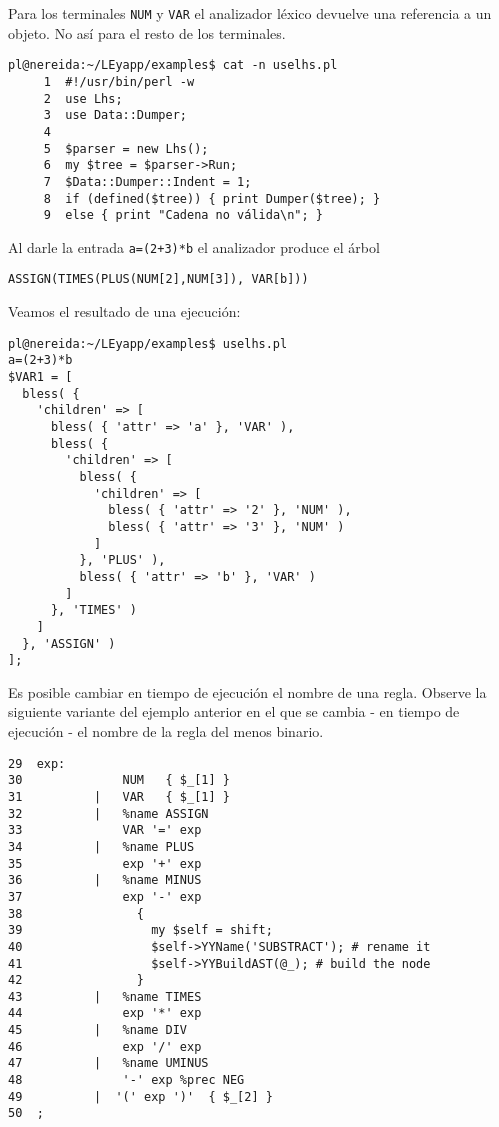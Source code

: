 Para los terminales \verb|NUM|
y \verb|VAR| el analizador léxico 
devuelve una referencia a un objeto.
No así para el resto de los terminales.


\begin{verbatim}
pl@nereida:~/LEyapp/examples$ cat -n uselhs.pl
     1  #!/usr/bin/perl -w
     2  use Lhs;
     3  use Data::Dumper;
     4
     5  $parser = new Lhs();
     6  my $tree = $parser->Run;
     7  $Data::Dumper::Indent = 1;
     8  if (defined($tree)) { print Dumper($tree); }
     9  else { print "Cadena no válida\n"; }
\end{verbatim}


Al darle la entrada \verb|a=(2+3)*b| el analizador produce el
árbol 

\begin{verbatim} 
ASSIGN(TIMES(PLUS(NUM[2],NUM[3]), VAR[b]))
\end{verbatim}

Veamos el resultado de una ejecución:

\begin{verbatim}
pl@nereida:~/LEyapp/examples$ uselhs.pl
a=(2+3)*b
$VAR1 = [
  bless( {
    'children' => [
      bless( { 'attr' => 'a' }, 'VAR' ),
      bless( {
        'children' => [
          bless( {
            'children' => [
              bless( { 'attr' => '2' }, 'NUM' ),
              bless( { 'attr' => '3' }, 'NUM' )
            ]
          }, 'PLUS' ),
          bless( { 'attr' => 'b' }, 'VAR' )
        ]
      }, 'TIMES' )
    ]
  }, 'ASSIGN' )
];
\end{verbatim}


Es posible cambiar en tiempo de ejecución
el nombre de una regla. Observe la siguiente 
variante del ejemplo anterior en el que se cambia
- en tiempo de ejecución - 
el nombre de la regla del menos binario.

\begin{verbatim}
29  exp:
30              NUM   { $_[1] }
31          |   VAR   { $_[1] }
32          |   %name ASSIGN
33              VAR '=' exp
34          |   %name PLUS
35              exp '+' exp
36          |   %name MINUS
37              exp '-' exp
38                {
39                  my $self = shift;
40                  $self->YYName('SUBSTRACT'); # rename it
41                  $self->YYBuildAST(@_); # build the node
42                }
43          |   %name TIMES
44              exp '*' exp
45          |   %name DIV
46              exp '/' exp
47          |   %name UMINUS
48              '-' exp %prec NEG
49          |  '(' exp ')'  { $_[2] }
50  ;
\end{verbatim}

